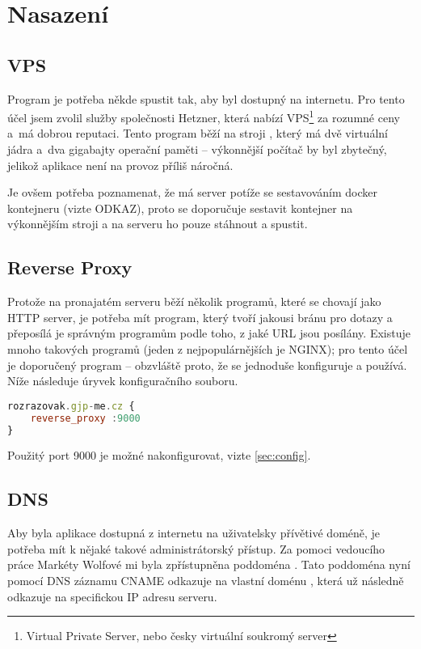 \hypertarget{Technologie}{\chapter{Nasazení}}

\section{VPS}

Program je potřeba někde spustit tak, aby byl dostupný na internetu. Pro tento účel jsem zvolil služby společnosti Hetzner, která nabízí VPS\footnote{Virtual Private Server, nebo česky virtuální soukromý server} za rozumné ceny a~má dobrou reputaci. Tento program běží na stroji , který má dvě virtuální jádra a~dva gigabajty operační paměti -- výkonnější počítač by byl zbytečný, jelikož aplikace není na provoz příliš náročná.

Je ovšem potřeba poznamenat, že má server potíže se sestavováním docker kontejneru (vizte ODKAZ), proto se doporučuje sestavit kontejner na výkonnějším stroji a na serveru ho pouze stáhnout a spustit. 

\section{Reverse Proxy}

Protože na pronajatém serveru běží několik programů, které se chovají jako HTTP server, je potřeba mít program, který tvoří jakousi bránu pro dotazy a přeposílá je správným programům podle toho, z jaké URL jsou posílány. Existuje mnoho takových programů (jeden z nejpopulárnějších je NGINX); pro tento účel je doporučený program  -- obzvláště proto, že se jednoduše konfiguruje a používá. Níže následuje úryvek konfiguračního souboru. 

\begin{lstlisting}[language=JavaScript,caption={Úryvek konfiguračního souboru Caddy}]
rozrazovak.gjp-me.cz {
    reverse_proxy :9000
}
\end{lstlisting}

Použitý port 9000 je možné nakonfigurovat, vizte \ref{sec:config}.

\section{DNS}

Aby byla aplikace dostupná z internetu na uživatelsky přívětivé doméně, je potřeba mít k nějaké takové administrátorský přístup. Za pomoci vedoucího práce Markéty Wolfové mi byla zpřístupněna poddoména . Tato poddoména nyní pomocí DNS záznamu CNAME odkazuje na vlastní doménu , která už následně odkazuje na specifickou IP adresu serveru. 

